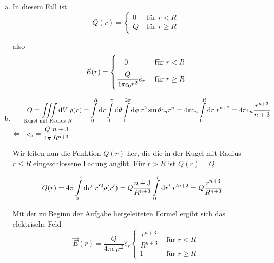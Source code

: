 \documentclass[a4paper,german,12pt,smallheadings]{scrartcl}
\begin{document}
\begin{enumerate}[a)]
  \item
    In diesem Fall ist
    \begin{equation}
      Q(r) = \begin{cases}
        0 & \text{ für } r < R \\
        Q & \text{ für } r \ge R
      \end{cases}
    \end{equation}

    also
    \begin{equation}
      \vec{E}(r) = \begin{cases}
        \; \; \; \; 0 & \text{ für } r < R
        \vspace{0.2 cm} \\
        \dfrac{Q}{4 \pi \epsilon_0 r^2} \hat{e}_r & \text{ für } r \ge R
      \end{cases}
    \end{equation}

  \item
    \begin{align}
      &Q = \iiint\limits_{\mathclap{\text{Kugel mit Radius $R$}}} \dif V \; \rho(r)
      = \int\limits_0^R \dif r \int\limits_0^\pi \dif \theta \int\limits_0^{2 \pi} \dif \phi \; r^2 \sin \theta c_n r^n
      = 4 \pi c_n \int\limits_0^R \dif r \; r^{n+2}
      = 4 \pi c_n \frac{r^{n+3}}{n+3} \\
      \Leftrightarrow\quad
      &c_n = \frac{Q}{4 \pi} \frac{n+3}{R^{n+3}}
    \end{align}

    Wir leiten nun die Funktion $Q(r)$ her, die die in der Kugel mit Radius $r
    \le R$ eingeschlossene Ladung angibt. Für $r > R$ ist $Q(r) = Q$.

    \begin{align}
      &Q(r) = 4 \pi \int\limits_0^r \dif r' \; r'^2 \rho(r') = Q \frac{n+3}{R^{n+3}} \int\limits_0^r \dif r' \; r'^{n+2} = Q \frac{r^{n+3}}{R^{n+3}}
    \end{align}

    Mit der zu Beginn der Aufgabe hergeleiteten Formel ergibt sich das elektrische Feld
    \begin{equation}
      \vec{E}(r) = \dfrac{Q}{4 \pi \epsilon_0 r^2} \hat{e}_r \begin{cases}
        \dfrac{r^{n+3}}{R^{n+3}} & \text{ für } r < R \\
        1 & \text{ für } r \ge R
      \end{cases}
    \end{equation}


\end{enumerate}
\end{document}
